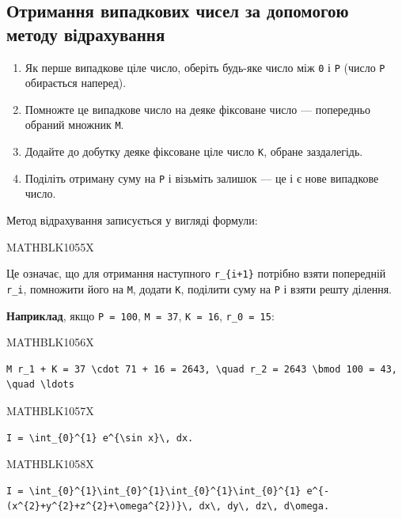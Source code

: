 \documentclass[
  ukrainian,
]{article}
\providecommand{\tightlist}{%
  \setlength{\itemsep}{0pt}\setlength{\parskip}{0pt}}
\begin{document}
\subsection{Отримання випадкових чисел за допомогою методу
відрахування}\label{ux43eux442ux440ux438ux43cux430ux43dux43dux44f-ux432ux438ux43fux430ux434ux43aux43eux432ux438ux445-ux447ux438ux441ux435ux43b-ux437ux430-ux434ux43eux43fux43eux43cux43eux433ux43eux44e-ux43cux435ux442ux43eux434ux443-ux432ux456ux434ux440ux430ux445ux443ux432ux430ux43dux43dux44f}

\begin{enumerate}
\def\labelenumi{\arabic{enumi}.}
\tightlist
\item
  Як перше випадкове ціле число, оберіть будь-яке число між \texttt{0} і
  \texttt{P} (число \texttt{P} обирається наперед).
\item
  Помножте це випадкове число на деяке фіксоване число --- попередньо
  обраний множник \texttt{M}.
\item
  Додайте до добутку деяке фіксоване ціле число \texttt{K}, обране
  заздалегідь.
\item
  Поділіть отриману суму на \texttt{P} і візьміть залишок --- це і є
  нове випадкове число.
\end{enumerate}

Метод відрахування записується у вигляді формули:

MATHBLK1055X

Це означає, що для отримання наступного \texttt{r\_\{i+1\}} потрібно
взяти попередній \texttt{r\_i}, помножити його на \texttt{M}, додати
\texttt{K}, поділити суму на \texttt{P} і взяти решту ділення.

\textbf{Наприклад}, якщо \texttt{P\ =\ 100}, \texttt{M\ =\ 37},
\texttt{K\ =\ 16}, \texttt{r\_0\ =\ 15}:

MATHBLK1056X

\begin{verbatim}
M r_1 + K = 37 \cdot 71 + 16 = 2643, \quad r_2 = 2643 \bmod 100 = 43, \quad \ldots
\end{verbatim}

MATHBLK1057X

\begin{verbatim}
I = \int_{0}^{1} e^{\sin x}\, dx.
\end{verbatim}

MATHBLK1058X

\begin{verbatim}
I = \int_{0}^{1}\int_{0}^{1}\int_{0}^{1}\int_{0}^{1} e^{-(x^{2}+y^{2}+z^{2}+\omega^{2})}\, dx\, dy\, dz\, d\omega.
\end{verbatim}
\end{document}
